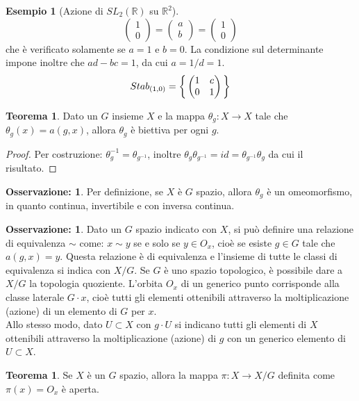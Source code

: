 \documentclass[12pt,a4paper]{report}
\theoremstyle{definition}
\theoremstyle{Theorem}
\newtheorem{Theo}[Def]{Teorema}
\theoremstyle{definition}
\newtheorem{Ex}[Def]{Esempio}
\theoremstyle{definition}
\theoremstyle{definition}
\newtheorem{Obs}[Def]{Osservazione:}
\begin{document}
\begin{Ex} [Azione di $SL_2(\mathbb{R})$ su $\mathbb{R}^2$]
$$\begin{pmatrix}
1\\0
\end{pmatrix}=\begin{pmatrix}
a\\b
\end{pmatrix}=\begin{pmatrix}
1\\0
\end{pmatrix}$$
che è verificato solamente se $a=1$ e $b=0$. La condizione sul determinante impone inoltre che $ad-bc=1$, da cui $a=1/d=1$.
$$Stab_{(1,0)}=\bigg{\{}\begin{pmatrix}
	1&c\\
	0&1
\end{pmatrix}\bigg{\}}$$
\end{Ex}
\begin{Theo}
	Dato un $G$ insieme $X$ e la mappa $\theta_g:X\rightarrow X$ tale che $\theta_g(x)=a(g,x)$, allora $\theta_g$ è biettiva per ogni $g$.
\end{Theo}
\begin{proof}
	Per costruzione: $\theta_g^{-1}=\theta_{g^{-1}}$, inoltre $\theta_g\theta_{g^{-1}}=id=\theta_{g^{-1}}\theta_g$ da cui il risultato.
\end{proof}
\begin{Obs}
	Per definizione, se $X$ è $G$ spazio, allora $\theta_g$ è un omeomorfismo, in quanto continua, invertibile e con inversa continua.
\end{Obs}
\begin{Obs}
	Dato un $G$ spazio indicato con $X$, si può definire una relazione di equivalenza $\sim$ come: $x\sim y$ se e solo se $y\in O_x$, cioè se esiste $g\in G$ tale che $a(g,x)=y$. Questa relazione è  di equivalenza e l'insieme di tutte le classi di equivalenza si indica con $X/G$. Se $G$ è uno spazio topologico, è possibile dare a $X/G$ la topologia quoziente. 
	L'orbita $O_x$ di un generico punto corrisponde alla classe laterale $G\cdot x$, cioè tutti gli elementi ottenibili attraverso la moltiplicazione (azione) di un elemento di $G$ per $x$. \\
	Allo stesso modo, dato $U\subset X$ con $g\cdot U$ si indicano tutti gli elementi di $X$ ottenibili attraverso la moltiplicazione (azione) di $g$ con un generico elemento di $U\subset X$. 
\end{Obs}
\begin{Theo}
	Se $X$ è un $G$ spazio, allora la mappa $\pi:X\rightarrow X/G$ definita come $\pi(x)=O_x$ è aperta.
\end{Theo}
\end{document}
